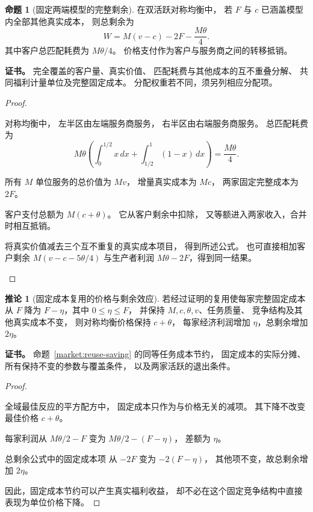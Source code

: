 \documentclass[UTF8,12pt,a4paper,openany,fontset=none,zihao=false]{ctexrep}
\theoremstyle{definition}
\newtheorem{proposition}{命题}[chapter]
\newtheorem{corollary}{推论}[chapter]
\newenvironment{certificate}{\par\noindent\textbf{证书。}\ignorespaces}{\par}
\newcommand{\1}{\mathbf 1}
\begin{document}
\begin{proposition}[固定两端模型的完整剩余]
\label{comp:hotelling-welfare}
在双活跃对称均衡中，
若 \(F\) 与 \(c\) 已涵盖模型内全部其他真实成本，
则总剩余为
\[
 W=M(v-c)-2F-\frac{M\theta}{4}.
\]
其中客户总匹配耗费为 \(M\theta/4\)。
价格支付作为客户与服务商之间的转移抵销。
\end{proposition}
\begin{certificate}
完全覆盖的客户量、真实价值、
匹配耗费与其他成本的互不重叠分解、
共同福利计量单位及完整固定成本。
分配权重若不同，须另列相应分配项。
\end{certificate}
\begin{proof}
\begin{semanticsteps}
\item 对称均衡中，
左半区由左端服务商服务，
右半区由右端服务商服务。
总匹配耗费为
\[
 M\theta\left(
 \int_0^{1/2}x\,dx+
 \int_{1/2}^1(1-x)\,dx
 \right)=\frac{M\theta}{4}.
\]
\item 所有 \(M\) 单位服务的总价值为 \(Mv\)，
增量真实成本为 \(Mc\)，
两家固定完整成本为 \(2F\)。
\item 客户支付总额为 \(M(c+\theta)\)。
它从客户剩余中扣除，
又等额进入两家收入，合并时相互抵销。
\item 将真实价值减去三个互不重复的真实成本项目，
得到所述公式。
也可直接相加客户剩余
\(M(v-c-5\theta/4)\)
与生产者利润 \(M\theta-2F\)，得到同一结果。
\end{semanticsteps}
\end{proof}

\begin{corollary}[固定成本复用的价格与剩余效应]
\label{comp:fixed-saving}
若经过证明的复用使每家完整固定成本从 \(F\)
降为 \(F-\eta\)，其中 \(0\le\eta\le F\)，
并保持 \(M,c,\theta,v\)、任务质量、
竞争结构及其他真实成本不变，
则对称均衡价格保持 \(c+\theta\)，
每家经济利润增加 \(\eta\)，总剩余增加 \(2\eta\)。
\end{corollary}
\begin{certificate}
命题~\ref{market:reuse-saving} 的同等任务成本节约，
固定成本的实际分摊、
所有保持不变的参数与覆盖条件，
以及两家活跃的退出条件。
\end{certificate}
\begin{proof}
\begin{semanticsteps}
\item 全域最佳反应的平方配方中，
固定成本只作为与价格无关的减项。
其下降不改变最佳价格 \(c+\theta\)。
\item 每家利润从 \(M\theta/2-F\)
变为 \(M\theta/2-(F-\eta)\)，
差额为 \(\eta\)。
\item 总剩余公式中的固定成本项
从 \(-2F\) 变为 \(-2(F-\eta)\)，
其他项不变，故总剩余增加 \(2\eta\)。
\end{semanticsteps}
因此，固定成本节约可以产生真实福利收益，
却不必在这个固定竞争结构中直接表现为单位价格下降。
\end{proof}
\end{document}
